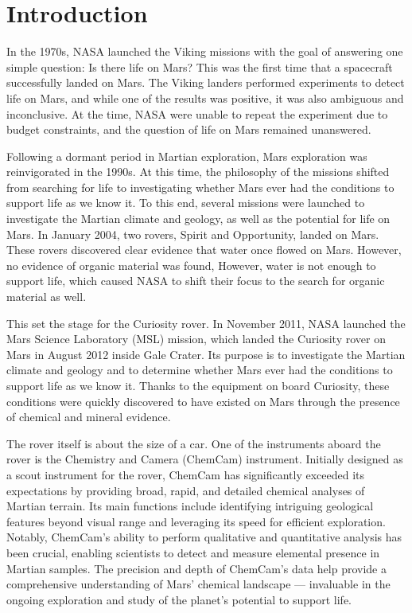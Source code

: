 \section{Introduction}\label{sec:introduction}
In the 1970s, NASA launched the Viking missions with the goal of answering one simple question: Is there life on Mars?
This was the first time that a spacecraft successfully landed on Mars.
The Viking landers performed experiments to detect life on Mars, and while one of the results was positive, it was also ambiguous and inconclusive.
At the time, NASA were unable to repeat the experiment due to budget constraints, and the question of life on Mars remained unanswered.\cite{marsnasagov_vikings}

Following a dormant period in Martian exploration, Mars exploration was reinvigorated in the 1990s.
At this time, the philosophy of the missions shifted from searching for life to investigating whether Mars ever had the conditions to support life as we know it.
To this end, several missions were launched to investigate the Martian climate and geology, as well as the potential for life on Mars.
In January 2004, two rovers, Spirit and Opportunity, landed on Mars.
These rovers discovered clear evidence that water once flowed on Mars.
However, no evidence of organic material was found,
However, water is not enough to support life, which caused NASA to shift their focus to the search for organic material as well.\cite{marsnasagov_observer}\cite{marsnasagov_spirit_opportunity}

This set the stage for the Curiosity rover.
In November 2011, NASA launched the Mars Science Laboratory (MSL) mission, which landed the Curiosity rover on Mars in August 2012 inside Gale Crater.
Its purpose is to investigate the Martian climate and geology and to determine whether Mars ever had the conditions to support life as we know it.
Thanks to the equipment on board Curiosity, these conditions were quickly discovered to have existed on Mars through the presence of chemical and mineral evidence.\cite{chemcamNasaWebsite}


The rover itself is about the size of a car.
One of the instruments aboard the rover is the Chemistry and Camera (ChemCam) instrument.
Initially designed as a scout instrument for the rover, ChemCam has significantly exceeded its expectations by providing broad, rapid, and detailed chemical analyses of Martian terrain.
Its main functions include identifying intriguing geological features beyond visual range and leveraging its speed for efficient exploration.
Notably, ChemCam's ability to perform qualitative and quantitative analysis has been crucial, enabling scientists to detect and measure elemental presence in Martian samples.
The precision and depth of ChemCam's data help provide a comprehensive understanding of Mars' chemical landscape --- invaluable in the ongoing exploration and study of the planet's potential to support life.\cite{chemcamNasaWebsite}


